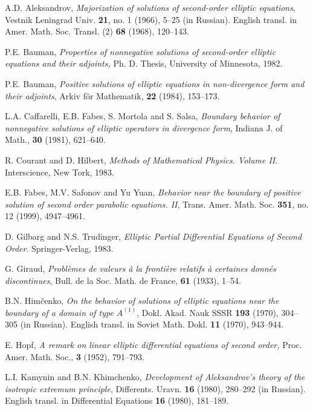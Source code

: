 \documentclass[regno,12pt]{amsart}
\theoremstyle{definition}
\theoremstyle{remark}
\begin{document}
\begin{thebibliography}{}

  A.D. Aleksandrov, \emph{Majorization of solutions of second-order elliptic equations}, Vestnik Leningrad Univ. \textbf{21}, no. 1 (1966), 5--25 (in Russian). English transl. in Amer. Math. Soc. Transl. (2) \textbf{68} (1968), 120--143.

  P.E. Bauman, \emph{Properties of nonnegative solutions of second-order elliptic equations and their adjoints,} Ph. D. Thesis, University of Minnesota, 1982.

  P.E. Bauman, \emph{Positive solutions of elliptic equations in non-divergence form and their adjoints}, Arkiv f\"{o}r Mathematik, \textbf{22} (1984), 153--173.

  L.A. Caffarelli, E.B. Fabes, S. Mortola and S. Salsa, \emph{Boundary behavior of nonnegative solutions of elliptic
operators in divergence form}, Indiana J. of Math., \textbf{30} (1981), 621--640.

 R. Courant and D. Hilbert, \emph{Methods of Mathematical Physics. Volume II}. Interscience, New Tork, 1983.

 E.B. Fabes, M.V. Safonov and Yu Yuan, \emph{Behavior near the boundary of positive solution of second order parabolic equations. II}, Trans. Amer. Math. Soc. \textbf{351}, no. 12 (1999), 4947--4961.

 D. Gilbarg and N.S. Trudinger, \emph{Elliptic Partial Differential Equations of Second Order}. Springer-Verlag, 1983.

 G. Giraud, \emph{Probl\`emes de valeurs \`a la fronti\`ere relatifs \`a certaines donn\'es discontinues}, Bull. de la Soc. Math. de France, \textbf{61} (1933), 1--54.

 B.N. Him\v{c}enko, \emph{On the behavior of solutions of elliptic equations near the boundary  of a domain of type $A^{(1)}$}, Dokl. Akad. Nauk SSSR \textbf{193} (1970), 304--305 (in Russian). English transl. in Soviet Math. Dokl. \textbf{11} (1970), 943--944.

 E. Hopf, \emph{A remark on linear elliptic differential equations of second order,} Proc. Amer. Math. Soc., \textbf{3} (1952), 791--793.

 L.I. Kamynin and B.N. Khimchenko, \emph{Development of Aleksandrov's theory of the isotropic extremum principle}, Differents. Uravn. \textbf{16} (1980), 280--292 (in Russian). English transl. in Differential Equations \textbf{16} (1980), 181--189.


\end{thebibliography}
\end{document}
